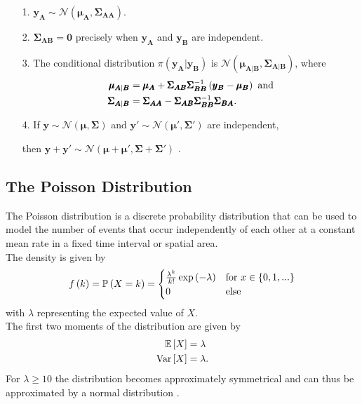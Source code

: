\begin{itemize}
    \item[1.] $\pmb{y}_{\pmb{A}}\sim\mathcal{N}\left(\pmb{\mu}_{\pmb{A}}, \pmb{\Sigma}_{\pmb{AA}}\right)$.
    \item[2.] $\pmb{\Sigma}_{\pmb{AB}}=\pmb{0}$ precisely when $\pmb{y}_{\pmb{A}}$ and $\pmb{y}_{\pmb{B}}$ are independent.
    \item[3.] The conditional distribution $\pi\left(\pmb{y}_{\pmb{A}}|\pmb{y}_{\pmb{B}}\right)$ is $\mathcal{N}\left(\pmb{\mu}_{\pmb{A}|\pmb{B}}, \pmb{\Sigma}_{\pmb{A}|\pmb{B}}\right)$, where
    \begin{align*}
        \pmb{\mu}_{\pmb{A}|\pmb{B}} &= \pmb{\mu}_{\pmb{A}}+\pmb{\Sigma}_{\pmb{AB}}\pmb{\Sigma}_{\pmb{BB}}^{-1}\left(\pmb{y}_{\pmb{B}}-\pmb{\mu}_{\pmb{B}}\right) \hbox{ and} \\
        \pmb{\Sigma}_{\pmb{A}|\pmb{B}} &= \pmb{\Sigma}_{\pmb{AA}}-\pmb{\Sigma}_{\pmb{AB}}\pmb{\Sigma}_{\pmb{BB}}^{-1}\pmb{\Sigma}_{\pmb{BA}}.
    \end{align*}
    \item[4.] If $\pmb{y}\sim\mathcal{N}\left(\pmb{\mu}, \pmb{\Sigma}\right)$ and $\pmb{y}'\sim\mathcal{N}\left(\pmb{\mu'}, \pmb{\Sigma'}\right)$ are independent, 
    \item[]then $\pmb{y}+\pmb{y'}\sim\mathcal{N}\left(\pmb{\mu}+ \pmb{\mu'}, \pmb{\Sigma}+ \pmb{\Sigma'}\right)$ \autocite[][19--20]{rue2005gaussian}.
\end{itemize}
\subsection{The Poisson Distribution}
The Poisson distribution is a discrete probability distribution that can be used to model the number of events that occur independently of each other at a constant mean rate in a fixed time interval or spatial area. \\
The density is given by
\begin{equation}
    f\left(k\right)=\mathbb{P}\left(X=k\right)=\begin{cases}
    \frac{\lambda^k}{k!}\exp\left(-\lambda\right) & \hbox{for }x\in\left\lbrace0,1,...\right\rbrace \\
    0 & \hbox{else}
    \end{cases}
\end{equation}
with $\lambda$ representing the expected value of $X$.  \\
The first two moments of the distribution are given by
\begin{align}
    \mathbb{E}\left[X\right] &= \lambda \label{eq:poisson_exp}\\
    \hbox{Var}\left[X\right] &= \lambda \label{eq:poisson_var}.
\end{align}
For $\lambda\geq10$ the distribution becomes approximately symmetrical and can thus be approximated by a normal distribution \autocite[][243]{fahrmeir2016statistik}.
